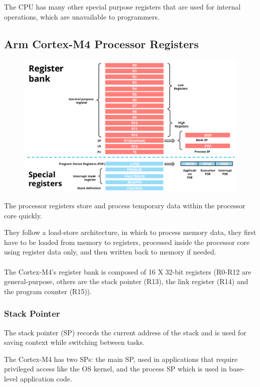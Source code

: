 The CPU has many other special purpose registers that are used for internal operations, which are
unavailable to programmers.


\subsection{Arm Cortex-M4 Processor Registers}

\begin{figure}[H]
    \centering
    \includegraphics[width=0.8\linewidth]{img/image16.png}
\end{figure}


The processor registers store and process temporary data within the processor core quickly.


They follow a load-store architecture, in which to process memory data, they first have to be loaded from
memory to registers, processed inside the processor core using register data only, and then written back
to memory if needed.

\paragraph{}
The Cortex-M4's register bank is composed of 16 X 32-bit registers (R0-R12 are general-purpose, others
are the stack pointer (R13), the link register (R14) and the program counter (R15)).

\subsubsection{Stack Pointer}
The stack pointer (SP) records the current address of the stack and is used for saving context while
switching between tasks.

The Cortex-M4 has two SPs: the main SP, used in applications that require privileged access like the OS
kernel, and the process SP which is used in base-level application code.


